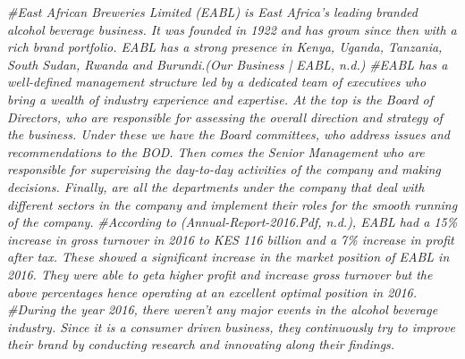 \documentclass[
]{article}
\newenvironment{Shaded}{\begin{snugshade}}{\end{snugshade}}
\newcommand{\CommentTok}[1]{\textcolor[rgb]{0.56,0.35,0.01}{\textit{#1}}}
\begin{document}
\begin{Shaded}
\begin{Highlighting}[]
\CommentTok{\#East African Breweries Limited (EABL) is East Africa’s leading branded alcohol beverage business. It was founded in 1922 and has grown since then with a rich brand portfolio. EABL has a strong presence in Kenya, Uganda, Tanzania, South Sudan, Rwanda and Burundi.(Our Business | EABL, n.d.)}
\CommentTok{\#EABL has a well{-}defined management structure led by a dedicated team of executives who bring a wealth of industry experience and expertise. At the top is the Board of Directors, who are responsible for assessing the overall direction and strategy of the business.  Under these we have the Board committees, who address issues and recommendations to the BOD. Then comes the Senior Management who are responsible for supervising the day{-}to{-}day activities of the company and making decisions. Finally, are all the departments under the company that deal with different sectors in the company and implement their roles for the smooth running of the company.  }
\CommentTok{\#According to (Annual{-}Report{-}2016.Pdf, n.d.), EABL had a 15\% increase in gross turnover in 2016 to KES 116 billion and a 7\% increase in profit after tax. These showed a significant increase in the market position of EABL in 2016. They were able to geta higher profit and increase gross turnover but the above percentages hence operating at an excellent optimal position in 2016.}
\CommentTok{\#During the year 2016, there weren’t any major events in the alcohol beverage industry. Since it is a consumer driven business, they continuously try to improve their brand by conducting research and innovating along their findings.}
\end{Highlighting}
\end{Shaded}
\end{document}
